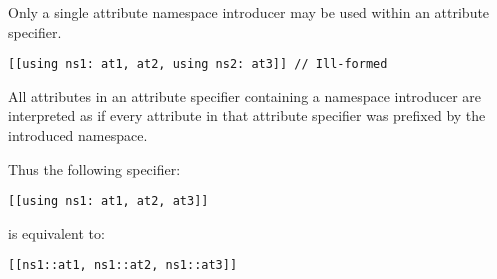 Only a single attribute namespace introducer may be used within an attribute
specifier.

\begin{lstlisting}
[[using ns1: at1, at2, using ns2: at3]] // Ill-formed
\end{lstlisting}


All attributes in an attribute specifier containing a namespace introducer are
interpreted as if every attribute in that attribute specifier was prefixed by
the introduced namespace.

Thus the following specifier:

\begin{lstlisting}
[[using ns1: at1, at2, at3]]
\end{lstlisting}

is equivalent to:

\begin{lstlisting}
[[ns1::at1, ns1::at2, ns1::at3]]
\end{lstlisting}


